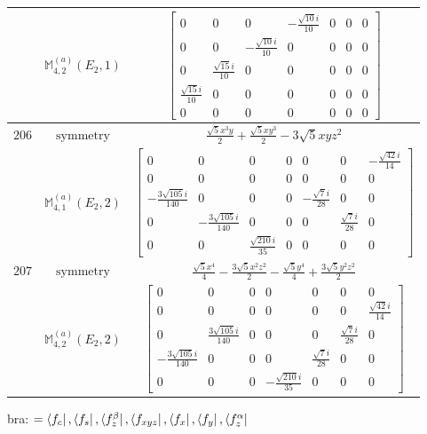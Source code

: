 \documentclass[fleqn,8pt,landscape]{jsarticle}
\begin{document}
\begin{longtable}{ccc}
$  $ & $ \mathbb{M}_{4,2}^{(a)}(E_{2},1) $ & $ \begin{bmatrix} 0 & 0 & 0 & - \frac{\sqrt{10} i}{10} & 0 & 0 & 0 \\ 0 & 0 & - \frac{\sqrt{10} i}{10} & 0 & 0 & 0 & 0 \\ 0 & \frac{\sqrt{15} i}{10} & 0 & 0 & 0 & 0 & 0 \\ \frac{\sqrt{15} i}{10} & 0 & 0 & 0 & 0 & 0 & 0 \\ 0 & 0 & 0 & 0 & 0 & 0 & 0 \end{bmatrix} $ \\ \hline
$ 206 $ & $ \text{symmetry} $ & $ \frac{\sqrt{5} x^{3} y}{2} + \frac{\sqrt{5} x y^{3}}{2} - 3 \sqrt{5} x y z^{2} $ \\
$  $ & $ \mathbb{M}_{4,1}^{(a)}(E_{2},2) $ & $ \begin{bmatrix} 0 & 0 & 0 & 0 & 0 & 0 & - \frac{\sqrt{42} i}{14} \\ 0 & 0 & 0 & 0 & 0 & 0 & 0 \\ - \frac{3 \sqrt{105} i}{140} & 0 & 0 & 0 & - \frac{\sqrt{7} i}{28} & 0 & 0 \\ 0 & - \frac{3 \sqrt{105} i}{140} & 0 & 0 & 0 & \frac{\sqrt{7} i}{28} & 0 \\ 0 & 0 & \frac{\sqrt{210} i}{35} & 0 & 0 & 0 & 0 \end{bmatrix} $ \\ \hline
$ 207 $ & $ \text{symmetry} $ & $ \frac{\sqrt{5} x^{4}}{4} - \frac{3 \sqrt{5} x^{2} z^{2}}{2} - \frac{\sqrt{5} y^{4}}{4} + \frac{3 \sqrt{5} y^{2} z^{2}}{2} $ \\
$  $ & $ \mathbb{M}_{4,2}^{(a)}(E_{2},2) $ & $ \begin{bmatrix} 0 & 0 & 0 & 0 & 0 & 0 & 0 \\ 0 & 0 & 0 & 0 & 0 & 0 & \frac{\sqrt{42} i}{14} \\ 0 & \frac{3 \sqrt{105} i}{140} & 0 & 0 & 0 & \frac{\sqrt{7} i}{28} & 0 \\ - \frac{3 \sqrt{105} i}{140} & 0 & 0 & 0 & \frac{\sqrt{7} i}{28} & 0 & 0 \\ 0 & 0 & 0 & - \frac{\sqrt{210} i}{35} & 0 & 0 & 0 \end{bmatrix} $ \\ \hline
\end{longtable}
bra: $=\bra{f_{c}}, \bra{f_{s}}, \bra{f_{z}^{\beta}}, \bra{f_{xyz}}, \bra{f_{x}}, \bra{f_{y}}, \bra{f_{z}^{\alpha}}$
\end{document}
